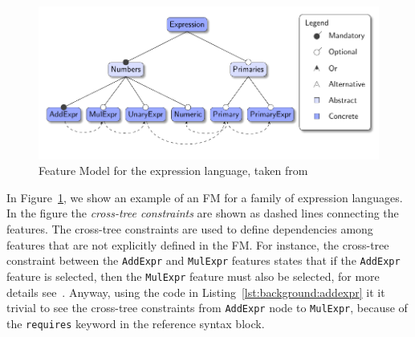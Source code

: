 \begin{figure}[t]
    \centering
    \includegraphics[width=0.9\linewidth]{figs/background/expression_featuremodel.pdf}
    \caption{Feature Model for the expression language, taken from \cite{Cazzola15f}}
    \label{lst:background:exprfeaturemodel}
\end{figure}

In Figure~\ref{lst:background:exprfeaturemodel}, we show an example of an FM for a family of expression languages. In the figure the \textit{cross-tree constraints} are shown as dashed lines connecting the features. The cross-tree constraints are used to define dependencies among features that are not explicitly defined in the FM. For instance, the cross-tree constraint between the \texttt{AddExpr} and \texttt{MulExpr} features states that if the \texttt{AddExpr} feature is selected, then the \texttt{MulExpr} feature must also be selected, for more details see~\cite{Cazzola15f}.
Anyway, using the code in Listing~\ref{lst:background:addexpr} it it trivial to see the cross-tree constraints from \texttt{AddExpr} node to \texttt{MulExpr}, because of the \texttt{requires} keyword in the reference syntax block.


